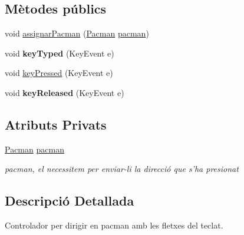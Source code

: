 \subsection*{Mètodes públics}
\begin{DoxyCompactItemize}
\item 
void \hyperlink{classlogica_1_1controladors__pacman_1_1_controlador_teclat_aab737c00c32133c65fafe6222c1eeb96}{assignar\+Pacman} (\hyperlink{classlogica_1_1_pacman}{Pacman} \hyperlink{classlogica_1_1controladors__pacman_1_1_controlador_teclat_addc6e4cafcb7e27900fc09948574bfd5}{pacman})
\item 
\hypertarget{classlogica_1_1controladors__pacman_1_1_controlador_teclat_af77e9d281ff2d126ef0f9a0cc88b5ec6}{void {\bfseries key\+Typed} (Key\+Event e)}\label{classlogica_1_1controladors__pacman_1_1_controlador_teclat_af77e9d281ff2d126ef0f9a0cc88b5ec6}

\item 
void \hyperlink{classlogica_1_1controladors__pacman_1_1_controlador_teclat_a0681f6a89077acfc27c9934ae5a446b7}{key\+Pressed} (Key\+Event e)
\item 
\hypertarget{classlogica_1_1controladors__pacman_1_1_controlador_teclat_ac6f43e2b1c35c8878e4d22577cd9210d}{void {\bfseries key\+Released} (Key\+Event e)}\label{classlogica_1_1controladors__pacman_1_1_controlador_teclat_ac6f43e2b1c35c8878e4d22577cd9210d}

\end{DoxyCompactItemize}
\subsection*{Atributs Privats}
\begin{DoxyCompactItemize}
\item 
\hypertarget{classlogica_1_1controladors__pacman_1_1_controlador_teclat_addc6e4cafcb7e27900fc09948574bfd5}{\hyperlink{classlogica_1_1_pacman}{Pacman} \hyperlink{classlogica_1_1controladors__pacman_1_1_controlador_teclat_addc6e4cafcb7e27900fc09948574bfd5}{pacman}}\label{classlogica_1_1controladors__pacman_1_1_controlador_teclat_addc6e4cafcb7e27900fc09948574bfd5}

\begin{DoxyCompactList}\small\item\em pacman, el necessitem per enviar-\/li la direcció que s'ha presionat \end{DoxyCompactList}\end{DoxyCompactItemize}


\subsection{Descripció Detallada}
Controlador per dirigir en pacman amb les fletxes del teclat. 

